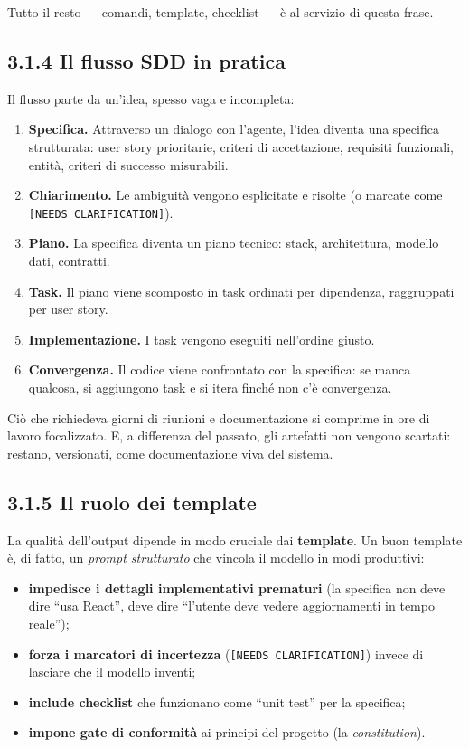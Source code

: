 \documentclass[
  italian,
  10pt,
]{book}
\providecommand{\tightlist}{%
  \setlength{\itemsep}{0pt}\setlength{\parskip}{0pt}}
\begin{document}
Tutto il resto --- comandi, template, checklist --- è al servizio di
questa frase.

\subsection{3.1.4 Il flusso SDD in
pratica}\label{il-flusso-sdd-in-pratica}

Il flusso parte da un'idea, spesso vaga e incompleta:

\begin{enumerate}
\def\labelenumi{\arabic{enumi}.}
\tightlist
\item
  \textbf{Specifica.} Attraverso un dialogo con l'agente, l'idea diventa
  una specifica strutturata: user story prioritarie, criteri di
  accettazione, requisiti funzionali, entità, criteri di successo
  misurabili.
\item
  \textbf{Chiarimento.} Le ambiguità vengono esplicitate e risolte (o
  marcate come \texttt{{[}NEEDS\ CLARIFICATION{]}}).
\item
  \textbf{Piano.} La specifica diventa un piano tecnico: stack,
  architettura, modello dati, contratti.
\item
  \textbf{Task.} Il piano viene scomposto in task ordinati per
  dipendenza, raggruppati per user story.
\item
  \textbf{Implementazione.} I task vengono eseguiti nell'ordine giusto.
\item
  \textbf{Convergenza.} Il codice viene confrontato con la specifica: se
  manca qualcosa, si aggiungono task e si itera finché non c'è
  convergenza.
\end{enumerate}

Ciò che richiedeva giorni di riunioni e documentazione si comprime in
ore di lavoro focalizzato. E, a differenza del passato, gli artefatti
non vengono scartati: restano, versionati, come documentazione viva del
sistema.

\subsection{3.1.5 Il ruolo dei template}\label{il-ruolo-dei-template}

La qualità dell'output dipende in modo cruciale dai \textbf{template}.
Un buon template è, di fatto, un \emph{prompt strutturato} che vincola
il modello in modi produttivi:

\begin{itemize}
\tightlist
\item
  \textbf{impedisce i dettagli implementativi prematuri} (la specifica
  non deve dire ``usa React'', deve dire ``l'utente deve vedere
  aggiornamenti in tempo reale'');
\item
  \textbf{forza i marcatori di incertezza}
  (\texttt{{[}NEEDS\ CLARIFICATION{]}}) invece di lasciare che il
  modello inventi;
\item
  \textbf{include checklist} che funzionano come ``unit test'' per la
  specifica;
\item
  \textbf{impone gate di conformità} ai principi del progetto (la
  \emph{constitution}).
\end{itemize}
\end{document}
